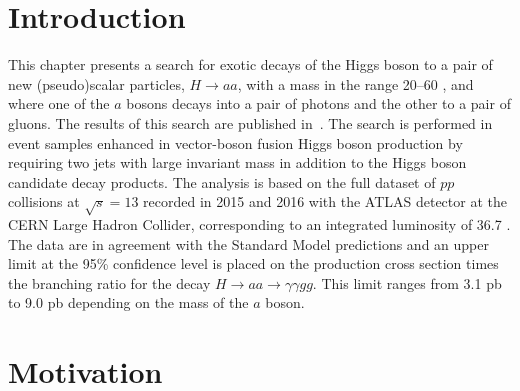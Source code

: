 \section{Introduction}
This chapter presents a search for exotic decays of the Higgs boson to a pair of new (pseudo)scalar
particles, $H\to aa$, with a mass in the range 20--60 \GeV{}, and where one of the $a$ bosons decays into a pair of photons and the other to a pair of gluons.
The results of this search are published in~\cite{ref:TODO}.
The search is performed in event samples enhanced in vector-boson fusion Higgs boson production
by requiring two jets with large invariant mass in addition to the Higgs boson candidate decay products.
The analysis is based on the full dataset of $pp$ collisions at $\sqrt{s}= 13$ \TeV{} recorded in 2015 and 2016 with the ATLAS detector at the CERN Large Hadron Collider,
corresponding to an integrated luminosity of 36.7 \ifb.
The data are in agreement with the Standard Model predictions and an upper limit at the 95\% confidence level is placed on the production cross section times the
branching ratio for the decay $H\to aa\to \gamma\gamma gg$.
This limit ranges from 3.1 pb to 9.0 pb depending on the mass of the $a$ boson.


\section{Motivation}

